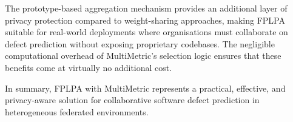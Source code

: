 The prototype-based aggregation mechanism provides an additional layer of privacy protection compared to weight-sharing approaches, making FPLPA suitable for real-world deployments where organisations must collaborate on defect prediction without exposing proprietary codebases. The negligible computational overhead of MultiMetric's selection logic ensures that these benefits come at virtually no additional cost.

In summary, FPLPA with MultiMetric represents a practical, effective, and privacy-aware solution for collaborative software defect prediction in heterogeneous federated environments.
